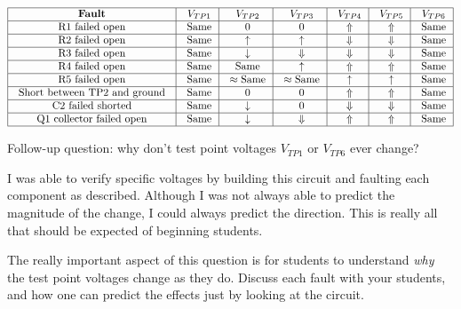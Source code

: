 
$$\vbox{\offinterlineskip
\halign{\strut
\vrule \quad\hfil # \ \hfil & 
\vrule \quad\hfil $#$ \ \hfil & 
\vrule \quad\hfil $#$ \ \hfil & 
\vrule \quad\hfil $#$ \ \hfil & 
\vrule \quad\hfil $#$ \ \hfil & 
\vrule \quad\hfil $#$ \ \hfil & 
\vrule \quad\hfil $#$ \ \hfil \vrule \cr 
\noalign{\hrule}
%
{\bf Fault} & V_{TP1} & V_{TP2} & V_{TP3} & V_{TP4} & V_{TP5} & V_{TP6} \cr
\noalign{\hrule}
%
R1 failed open & \hbox{Same} & 0 & 0 & \Uparrow & \Uparrow & \hbox{Same} \cr
\noalign{\hrule}
%
R2 failed open & \hbox{Same} & \uparrow & \uparrow & \Downarrow & \Downarrow & \hbox{Same} \cr
\noalign{\hrule}
%
R3 failed open & \hbox{Same} & \downarrow & \Downarrow & \Downarrow & \Downarrow & \hbox{Same} \cr
\noalign{\hrule}
%
R4 failed open & \hbox{Same} & \hbox{Same} & \uparrow & \Uparrow & \Uparrow & \hbox{Same} \cr
\noalign{\hrule}
%
R5 failed open & \hbox{Same} & \approx \hbox{Same} & \approx \hbox{Same} & \uparrow & \uparrow & \hbox{Same} \cr
\noalign{\hrule}
%
Short between TP2 and ground & \hbox{Same} & 0 & 0 & \Uparrow & \Uparrow & \hbox{Same} \cr
\noalign{\hrule}
%
C2 failed shorted & \hbox{Same} & \downarrow & 0 & \Downarrow & \Downarrow & \hbox{Same} \cr
\noalign{\hrule}
%
Q1 collector failed open & \hbox{Same} & \downarrow & \Downarrow & \Uparrow & \Uparrow & \hbox{Same} \cr
\noalign{\hrule}
} %
}$$ %

\vskip 10pt

Follow-up question: why don't test point voltages $V_{TP1}$ or $V_{TP6}$ ever change?







I was able to verify specific voltages by building this circuit and faulting each component as described.  Although I was not always able to predict the magnitude of the change, I could always predict the direction.  This is really all that should be expected of beginning students.

The really important aspect of this question is for students to understand {\it why} the test point voltages change as they do.  Discuss each fault with your students, and how one can predict the effects just by looking at the circuit.




